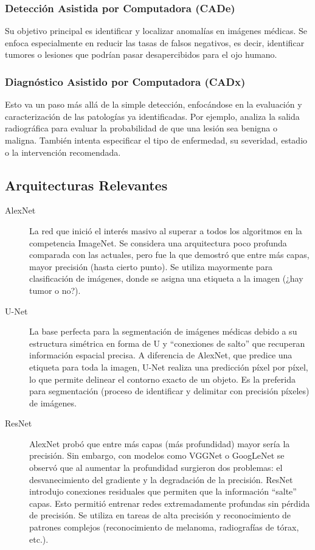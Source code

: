 \subsubsection{Detección Asistida por Computadora (CADe)}

Su objetivo principal es identificar y localizar anomalías en imágenes médicas. Se enfoca especialmente en reducir las tasas de falsos negativos, es decir, identificar tumores o lesiones que podrían pasar desapercibidos para el ojo humano.
  
\subsubsection{Diagnóstico Asistido por Computadora (CADx)}
Esto va un paso más allá de la simple detección, enfocándose en la evaluación y caracterización de las patologías ya identificadas. Por ejemplo, analiza la salida radiográfica para evaluar la probabilidad de que una lesión sea benigna o maligna. También intenta especificar el tipo de enfermedad, su severidad, estadio o la intervención recomendada.
 
\subsection{Arquitecturas Relevantes}

\begin{description}
    \item[AlexNet] La red que inició el interés masivo al superar a todos los algoritmos en la competencia ImageNet. Se considera una arquitectura poco profunda comparada con las actuales, pero fue la que demostró que entre más capas, mayor precisión (hasta cierto punto). Se utiliza mayormente para clasificación de imágenes, donde se asigna una etiqueta a la imagen (¿hay tumor o no?).
    
    \item[U-Net] La base perfecta para la segmentación de imágenes médicas debido a su estructura simétrica en forma de U y \enquote{conexiones de salto} que recuperan información espacial precisa. A diferencia de AlexNet, que predice una etiqueta para toda la imagen, U-Net realiza una predicción píxel por píxel, lo que permite delinear el contorno exacto de un objeto. Es la preferida para segmentación (proceso de identificar y delimitar con precisión píxeles) de imágenes. 
    
    \item[ResNet] AlexNet probó que entre más capas (más profundidad) mayor sería la precisión. Sin embargo, con modelos como VGGNet o GoogLeNet se observó que al aumentar la profundidad surgieron dos problemas: el desvanecimiento del gradiente y la degradación de la precisión. ResNet introdujo conexiones residuales que permiten que la información \enquote{salte} capas. Esto permitió entrenar redes extremadamente profundas sin pérdida de precisión. Se utiliza en tareas de alta precisión y reconocimiento de patrones complejos (reconocimiento de melanoma, radiografías de tórax, etc.).
\end{description}

